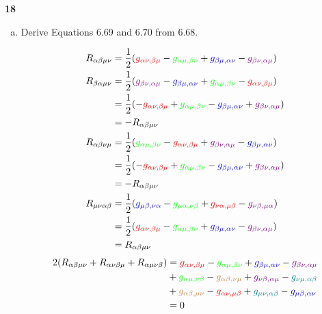\documentclass[gr-notes.tex]{subfiles}
\begin{document}
\textbf{18}
\begin{enumerate}[(a)]
\item Derive Equations 6.69 and 6.70 from 6.68.

\begin{align*}
  R_{\alpha\beta\mu\nu} &=
  \frac{1}{2} (
    {\color{red}    g_{\alpha\nu,\beta\mu}} -
    {\color{green}  g_{\alpha\mu,\beta\nu}} +
    {\color{blue}   g_{\beta\mu,\alpha\nu}} -
    {\color{violet} g_{\beta\nu,\alpha\mu}}
  )
  \\
  R_{\beta\alpha\mu\nu} &=
  \frac{1}{2} (
    {\color{violet} g_{\beta\nu,\alpha\mu}} -
    {\color{blue}   g_{\beta\mu,\alpha\nu}} +
    {\color{green}  g_{\alpha\mu,\beta\nu}} -
    {\color{red}    g_{\alpha\nu,\beta\mu}}
  )
  \\ &=
  \frac{1}{2} (
   -{\color{red}    g_{\alpha\nu,\beta\mu}} +
    {\color{green}  g_{\alpha\mu,\beta\nu}} -
    {\color{blue}   g_{\beta\mu,\alpha\nu}} +
    {\color{violet} g_{\beta\nu,\alpha\mu}}
  )
  \\ &=
  -R_{\alpha\beta\mu\nu}
  \\
  R_{\alpha\beta\nu\mu} &=
  \frac{1}{2} (
    {\color{green}  g_{\alpha\mu,\beta\nu}} -
    {\color{red}    g_{\alpha\nu,\beta\mu}} +
    {\color{violet} g_{\beta\nu,\alpha\mu}} -
    {\color{blue}   g_{\beta\mu,\alpha\nu}}
  )
  \\ &=
  \frac{1}{2} (
   -{\color{red}    g_{\alpha\nu,\beta\mu}} +
    {\color{green}  g_{\alpha\mu,\beta\nu}} -
    {\color{blue}   g_{\beta\mu,\alpha\nu}} +
    {\color{violet} g_{\beta\nu,\alpha\mu}}
  )
  \\ &=
  -R_{\alpha\beta\mu\nu}
  \\
  R_{\mu\nu\alpha\beta} &=
  \frac{1}{2} (
    {\color{blue}   g_{\mu\beta,\nu\alpha}} -
    {\color{green}  g_{\mu\alpha,\nu\beta}} +
    {\color{red}    g_{\nu\alpha,\mu\beta}} -
    {\color{violet} g_{\nu\beta,\mu\alpha}}
  )
  \\ &=
  \frac{1}{2} (
    {\color{red}    g_{\alpha\nu,\beta\mu}} -
    {\color{green}  g_{\alpha\mu,\beta\nu}} +
    {\color{blue}   g_{\beta\mu,\alpha\nu}} -
    {\color{violet} g_{\beta\nu,\alpha\mu}}
  )
  \\ &=
  R_{\alpha\beta\mu\nu}
\end{align*}
%
\begin{align*}
  2 (R_{\alpha\beta\mu\nu} + R_{\alpha\nu\beta\mu} + R_{\alpha\mu\nu\beta}) &=
  {\color{red}    g_{\alpha\nu,\beta\mu}} -
  {\color{green}  g_{\alpha\mu,\beta\nu}} +
  {\color{blue}   g_{\beta\mu,\alpha\nu}} -
  {\color{violet} g_{\beta\nu,\alpha\mu}}
  \\ &+
  {\color{green}  g_{\alpha\mu,\nu\beta}} -
  {\color{brown}  g_{\alpha\beta,\nu\mu}} +
  {\color{violet} g_{\nu\beta,\alpha\mu}} -
  {\color{teal}   g_{\nu\mu,\alpha\beta}}
  \\ &+
  {\color{brown}  g_{\alpha\beta,\mu\nu}} -
  {\color{red}    g_{\alpha\nu,\mu\beta}} +
  {\color{teal}   g_{\mu\nu,\alpha\beta}} -
  {\color{blue}   g_{\mu\beta,\alpha\nu}}
  \\ &=
  0
\end{align*}


\end{enumerate}
\end{document}
